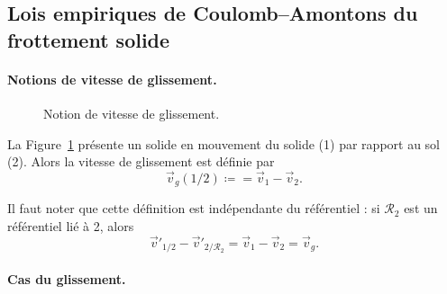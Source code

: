     \subsection{Lois empiriques de Coulomb--Amontons du frottement solide}

        \paragraph{Notions de vitesse de glissement.}

            \begin{figure}
                \centering
                \caption{Notion de vitesse de glissement.}    
                \label{fig:notion_vitesse_glissement}
            \end{figure}

            La Figure~\ref{fig:notion_vitesse_glissement} présente un solide en mouvement du solide (1) par rapport au sol (2). Alors la vitesse de glissement est définie par 
            \begin{equation}
                \vec{v}_g(1/2)\coloneqq =\vec{v}_1-\vec{v}_2.
            \end{equation}

            Il faut noter que cette définition est indépendante du référentiel : si $\mathcal{R}_2$ est un référentiel lié à 2, alors 
            \begin{equation}
                \vec{v}'_{1/2}-\vec{v}'_{2/\mathcal{R}_2}=\vec{v}_1-\vec{v}_2=\vec{v}_g.
            \end{equation}

        \paragraph{Cas du glissement.} 
            
